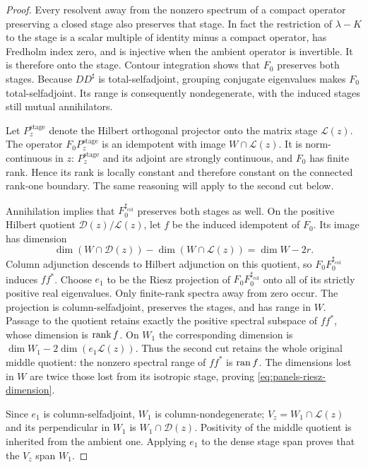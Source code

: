 \begin{proof}
Every resolvent away from the nonzero spectrum of a compact operator
preserving a closed stage also preserves that stage.  In fact the
restriction of $\lambda-K$ to the stage is a scalar multiple of identity
minus a compact operator, has Fredholm index zero, and is injective when
the ambient operator is invertible.  It is therefore onto the stage.
Contour integration shows that $F_0$ preserves both stages.  Because
$DD^\sharp$ is total-selfadjoint, grouping conjugate eigenvalues makes
$F_0$ total-selfadjoint.  Its range is consequently nondegenerate, with
the induced stages still mutual annihilators.

Let $P_z^{\mathrm{stage}}$ denote the Hilbert orthogonal projector onto
the matrix stage $\mathcal L(z)$.  The operator $F_0P_z^{\mathrm{stage}}$
is an idempotent with image $W\cap\mathcal L(z)$.  It is norm-continuous
in $z$: $P_z^{\mathrm{stage}}$ and its adjoint are strongly continuous,
and $F_0$ has finite rank.  Hence its rank is locally constant and therefore
constant on the connected rank-one boundary.  The same reasoning will
apply to the second cut below.

Annihilation implies that $F_0^{\sharp_{\mathrm{col}}}$ preserves both
stages as well.  On the positive Hilbert quotient
$\mathcal D(z)/\mathcal L(z)$, let $f$ be the induced idempotent of
$F_0$.  Its image has dimension
\[
 \dim(W\cap\mathcal D(z))-
 \dim(W\cap\mathcal L(z))=\dim W-2r.
\]
Column adjunction descends to Hilbert adjunction on this quotient, so
$F_0F_0^{\sharp_{\mathrm{col}}}$ induces $ff^*$.  Choose $e_1$ to be
the Riesz projection of $F_0F_0^{\sharp_{\mathrm{col}}}$ onto all of
its strictly positive real eigenvalues.  Only finite-rank spectra away
from zero occur.  The projection is column-selfadjoint, preserves the
stages, and has range in $W$.  Passage to the quotient retains exactly
the positive spectral subspace of $ff^*$, whose dimension is $\operatorname{rank} f$.
On $W_1$ the corresponding dimension is
$\dim W_1-2\dim(e_1\mathcal L(z))$.  Thus the second cut retains the
whole original middle quotient: the nonzero spectral range of $ff^*$ is
$\operatorname{ran} f$.  The dimensions lost in $W$ are twice those lost from its
isotropic stage, proving \eqref{eq:panels-riesz-dimension}.

Since $e_1$ is column-selfadjoint, $W_1$ is column-nondegenerate;
$V_z=W_1\cap\mathcal L(z)$ and its perpendicular in $W_1$ is
$W_1\cap\mathcal D(z)$.  Positivity of the middle quotient is inherited
from the ambient one.  Applying $e_1$ to the dense stage span proves that
the $V_z$ span $W_1$.


\end{proof}

